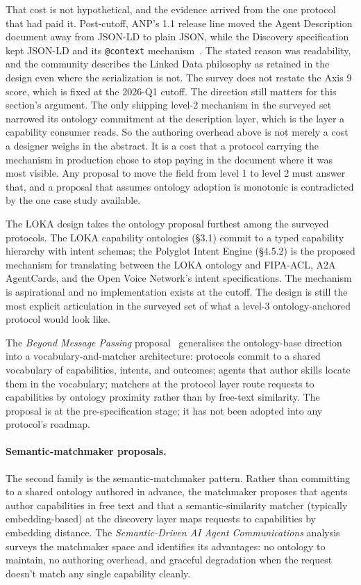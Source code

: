 That cost is not hypothetical, and the evidence arrived
from the one protocol that had paid it. Post-cutoff, ANP's
1.1 release line moved the Agent Description document away
from JSON-LD to plain JSON, while the Discovery
specification kept JSON-LD and its \texttt{@context}
mechanism~\cite{spec_anp_v11}. The stated reason was
readability, and the community describes the Linked Data
philosophy as retained in the design even where the
serialization is not. The survey does not restate the Axis
9 score, which is fixed at the 2026-Q1 cutoff. The
direction still matters for this section's argument. The
only shipping level-2 mechanism in the surveyed set
narrowed its ontology commitment at the description layer,
which is the layer a capability consumer reads. So the
authoring overhead above is not merely a cost a designer
weighs in the abstract. It is a cost that a protocol
carrying the mechanism in production chose to stop paying
in the document where it was most visible. Any proposal to
move the field from level 1 to level 2 must answer that,
and a proposal that assumes ontology adoption is
monotonic is contradicted by the one case study
available.

The LOKA design takes the ontology proposal furthest among
the surveyed protocols. The LOKA capability ontologies
(\S 3.1) commit to a typed
capability hierarchy with intent schemas; the Polyglot
Intent Engine (\S 4.5.2) is the proposed mechanism for
translating between the LOKA ontology and FIPA-ACL, A2A
AgentCards, and the Open Voice Network's intent
specifications. The mechanism is aspirational and no
implementation exists at the cutoff. The design is still
the most explicit articulation in the surveyed set of what
a level-3 ontology-anchored protocol would look like.

The \emph{Beyond Message Passing} proposal~\cite{beyond_message_passing}
generalises the ontology-base direction into a
vocabulary-and-matcher architecture: protocols commit to a
shared vocabulary of capabilities, intents, and outcomes;
agents that author skills locate them in the vocabulary;
matchers at the protocol layer route requests to capabilities
by ontology proximity rather than by free-text similarity.
The proposal is at the pre-specification stage; it has not
been adopted into any protocol's roadmap.

\paragraph{Semantic-matchmaker proposals.}
The second family is the semantic-matchmaker pattern. Rather
than committing to a shared ontology authored in advance, the
matchmaker proposes that agents author capabilities in free
text and that a semantic-similarity matcher (typically
embedding-based) at the discovery layer maps requests to
capabilities by embedding distance. The
\emph{Semantic-Driven AI Agent Communications} analysis
\cite{semantic_driven} surveys the matchmaker space and
identifies its advantages: no ontology to maintain, no
authoring overhead, and graceful degradation when the
request doesn't match any single capability cleanly.


